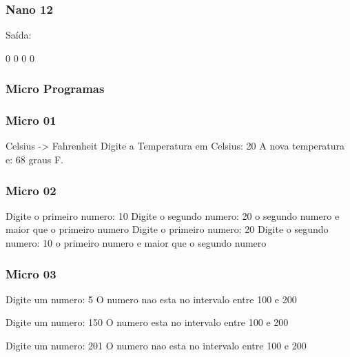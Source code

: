 \documentclass[12pt,a4paper,twoside]{report}
\begin{document}
\subsubsection{Nano 12}


Saída:
\begin{terminal}
0
0
0
0
\end{terminal}

\subsubsection{Micro Programas}
\subsubsection{Micro 01}


\begin{terminal}
Celsius -> Fahrenheit
Digite a Temperatura em Celsius: 20
A nova temperatura e: 68 graus F.
\end{terminal}

\subsubsection{Micro 02}


\begin{terminal}
Digite o primeiro numero: 10
Digite o segundo numero: 20
o segundo numero e maior que o primeiro numero
Digite o primeiro numero: 20
Digite o segundo numero: 10
o primeiro numero e maior que o segundo numero
\end{terminal}

\subsubsection{Micro 03}


\begin{terminal}
Digite um numero: 5
O numero nao esta no intervalo entre 100 e 200

Digite um numero: 150
O numero esta no intervalo entre 100 e 200

Digite um numero: 201
O numero nao esta no intervalo entre 100 e 200
\end{terminal}
\end{document}
